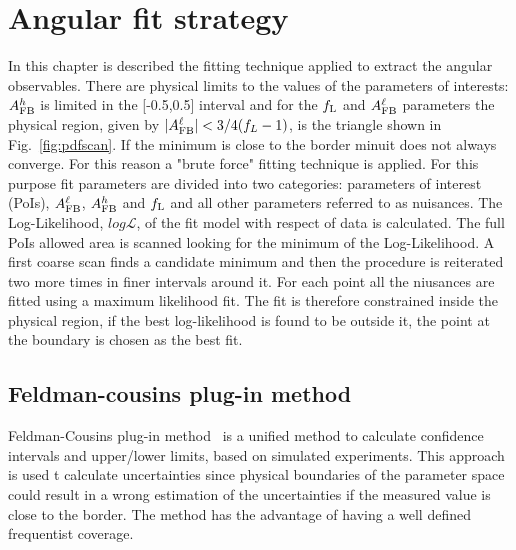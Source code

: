 \chapter{Angular fit strategy}

In this chapter is described the fitting technique applied to extract the angular observables.
There are physical limits to the values of the parameters of interests:
$A_{\rm FB}^h$ is limited in the [-0.5,0.5] interval and for the $f_{\rm L}$ and 
$A_{\rm FB}^\ell$ parameters the physical region, given by $|A_{\rm FB}^\ell| < 3/4(f_L-1)$,
is the triangle shown in Fig.~\ref{fig:pdfscan}.
If the minimum is close to the border minuit does not always converge. For this reason
a "brute force" fitting technique is applied. For this purpose fit parameters are
divided into two categories: parameters of interest (PoIs), $A_{\rm FB}^\ell$,
$A_{\rm FB}^h$ and $f_{\rm L}$ and all other parameters referred to as nuisances.
The Log-Likelihood, $log\mathcal{L}$, of the fit model with respect of data is calculated.
The full PoIs allowed area is scanned looking for the minimum of the Log-Likelihood.
A first coarse scan finds a candidate minimum and then the procedure is reiterated two
more times in finer intervals around it. For each point all the niusances are fitted
using a maximum likelihood fit. The fit is therefore constrained inside the physical
region, if the best log-likelihood is found to be outside it, the point at the boundary
is chosen as the best fit. %

\section{Feldman-cousins plug-in method}
\label{sec:FeldmanCousins}
Feldman-Cousins plug-in method~\cite{Karbach:2011uz} is a unified method to calculate confidence
intervals and upper/lower limits, based on simulated experiments. 
This approach is used t calculate uncertainties since physical boundaries of the parameter space
could result in a wrong estimation of the uncertainties if the measured value is close to the border.
The method has the advantage of having a well defined frequentist coverage.


